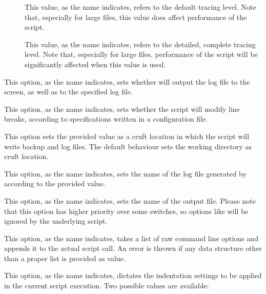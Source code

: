 \begin{description}
\begin{description}
\begin{description}
\item[] This value, as the name indicates, refers to the default tracing level. Note that, especially for large files, this value does affect performance of the script.

\item[] This value, as the name indicates, refers to the detailed, complete tracing level. Note that, especially for large files, performance of the script will be significantly affected when this value is used.
\end{description}

\item[\rpsbox{screenlog}] This option, as the name indicates, sets whether  will output the log file to the screen, as well as to the specified log file.

\item[\rpsbox{modifylinebreaks}] This option, as the name indicates, sets whether the script will modify line breaks, according to specifications written in a configuration file.

\item[\abox{cruft}] This option sets the provided value as a cruft location in which the script will write backup and log files. The default behaviour sets the working directory as cruft location.

\item[\abox{logfile}] This option, as the name indicates, sets the name of the log file generated by  according to the provided value.

\item[\abox{output}] This option, as the name indicates, sets the name of the output file. Please note that this option has higher priority over some switches, so options like  will be ignored by the underlying script.

\item[\abox{options}] This option, as the name indicates, takes a list of raw command line options and appends it to the actual script call. An error is thrown if any data structure other than a proper list is provided as value.

\item[\abox{settings}] This option, as the name indicates, dictates the indentation settings to be applied in the current script execution. Two possible values are available:


\end{description}
\end{description}
